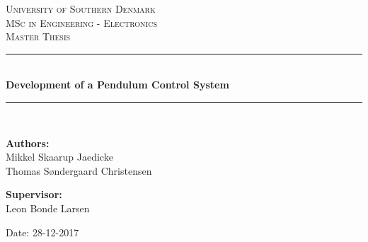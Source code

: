 \begin{titlepage}
\begin{center}

\textsc{\LARGE University of Southern Denmark}\\[1.5cm]
\textsc{\Large MSc in Engineering - Electronics}\\
\textsc{\large Master Thesis}\\[0.5cm]

\vfill
\vspace{3cm}
\hrule ~\\[0.3cm]
{ \LARGE \bfseries Development of a Pendulum Control System\\[0.4cm] }
\hrule ~\\[1.5cm]

\vfill

\vspace{5cm}
\begin{minipage}[t]{.55\textwidth}
\begin{flushleft} \large
\textbf{Authors:}\\
Mikkel Skaarup Jaedicke\\
Thomas Søndergaard Christensen
\end{flushleft}
\end{minipage}
\begin{minipage}[t]{.44\textwidth}
\begin{flushright} \large
\textbf{Supervisor:} \\
Leon Bonde Larsen
\end{flushright}
\end{minipage}

\vspace{1cm}
Date: 28-12-2017

\vspace{1cm}

\end{center}
\end{titlepage}